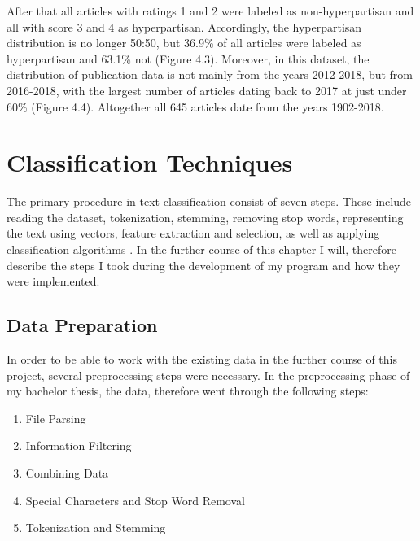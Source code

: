 \documentclass[a4paper, 11pt,titlepage,oneside,openany]{book}
\begin{document}
After that all articles with ratings 1 and 2 were labeled as non-hyperpartisan and all with score 3 and 4 as hyperpartisan.
Accordingly, the hyperpartisan distribution is no longer 50:50, but 36.9\% of all articles were labeled as hyperpartisan and 63.1\% not (Figure 4.3).
\noindent Moreover, in this dataset, the distribution of publication data is not mainly from the years 2012-2018, but from 2016-2018, with the largest number of articles dating back to 2017 at just under 60\% (Figure 4.4). Altogether all 645 articles date from the years 1902-2018.




\chapter{Classification Techniques}
The primary procedure in text classification consist of seven steps. These include  reading the dataset, tokenization, stemming, removing stop words, representing the text using vectors, feature extraction and selection, as well as applying classification algorithms \cite{textclassification}. In the further course of this chapter I  will, therefore describe the steps I took during the development of my program and how they were implemented.

\section{Data Preparation}
In order to be able to work with the existing data in the further course of this project, several preprocessing steps were necessary. In the preprocessing phase of my bachelor thesis, the data, therefore went through the following steps:
\begin{enumerate}
	\item File Parsing
	\item Information Filtering
	\item Combining Data
	\item Special Characters and Stop Word Removal
	\item Tokenization and Stemming
\end{enumerate}	
\end{document}
